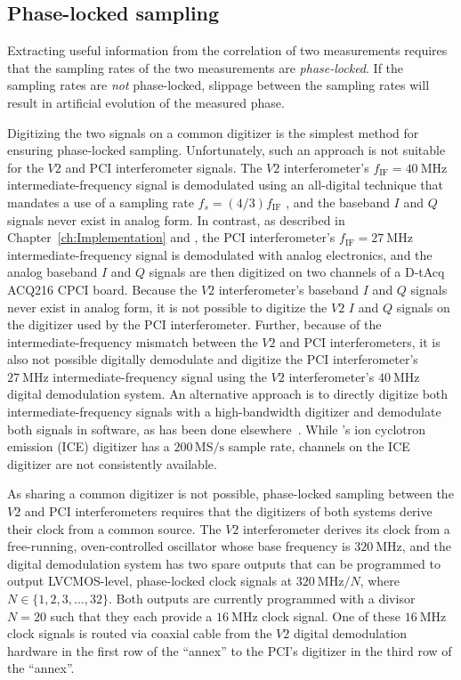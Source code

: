 \subsection{Phase-locked sampling}
\label{sec:ToroidalCorrelation:implementation_details_and_nonideal_effects:phase_locked_sampling}
Extracting useful information
from the correlation of two measurements
requires that the sampling rates of the two measurements
are \emph{phase-locked}.
If the sampling rates are \emph{not} phase-locked,
slippage between the sampling rates
will result in artificial evolution of the measured phase.

Digitizing the two signals on a common digitizer
is the simplest method for ensuring phase-locked sampling.
Unfortunately, such an approach is not suitable
for the $V2$ and PCI interferometer signals.
The $V2$ interferometer's
$f_{\text{IF}} = \SI{40}{\mega\hertz}$ intermediate-frequency signal
is demodulated using an all-digital technique
that mandates a use of a sampling rate
$f_s = (4 / 3) f_{\text{IF}}$
\cite{vanzeeland_rsi08}, and
the baseband $I$ and $Q$ signals never exist in analog form.
In contrast, as described in
Chapter~\ref{ch:Implementation} and \cite{davis_rsi16},
the PCI interferometer's
$f_{\text{IF}} = \SI{27}{\mega\hertz}$ intermediate-frequency signal
is demodulated with analog electronics, and
the analog baseband $I$ and $Q$ signals
are then digitized on two channels of a D-tAcq ACQ216 CPCI board.
Because the $V2$ interferometer's baseband $I$ and $Q$ signals
never exist in analog form,
it is not possible to digitize the $V2$ $I$ and $Q$ signals
on the digitizer used by the PCI interferometer.
Further, because of the intermediate-frequency mismatch
between the $V2$ and PCI interferometers,
it is also not possible digitally demodulate and digitize
the PCI interferometer's $\SI{27}{\mega\hertz}$ intermediate-frequency signal
using the $V2$ interferometer's
$\SI{40}{\mega\hertz}$ digital demodulation system.
An alternative approach is to directly digitize
both intermediate-frequency signals
with a high-bandwidth digitizer and
demodulate both signals in software,
as has been done elsewhere~\cite{mlynek_fst12}.
While \diiid's ion cyclotron emission (ICE) digitizer
has a $200 \, \text{MS/s}$ sample rate,
channels on the ICE digitizer are not consistently available.

As sharing a common digitizer is not possible,
phase-locked sampling between the $V2$ and PCI interferometers
requires that the digitizers of both systems
derive their clock from a common source.
The $V2$ interferometer derives its clock
from a free-running, oven-controlled oscillator
whose base frequency is $\SI{320}{\mega\hertz}$, and
the digital demodulation system
has two spare outputs that can be programmed
to output LVCMOS-level, phase-locked clock signals
at $\SI{320}{\mega\hertz} / N$, where
$N \in \{1, 2, 3, ..., 32\}$.
Both outputs are currently programmed with a divisor $N = 20$
such that they each provide a $\SI{16}{\mega\hertz}$ clock signal.
\graffito{\textcolor{red}{Picture? For posterity}}
One of these $\SI{16}{\mega\hertz}$ clock signals
is routed via coaxial cable
from the $V2$ digital demodulation hardware
in the first row of the \diiid\space ``annex''
to the PCI's digitizer
in the third row of the \diiid\space ``annex''.

